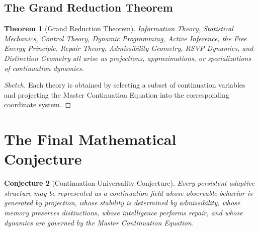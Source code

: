 \documentclass[12pt,a4paper]{article}
\newtheorem{theorem}{Theorem}[section]
\newtheorem{conjecture}[theorem]{Conjecture}
\begin{document}
\subsection{The Grand Reduction Theorem}

\begin{theorem}[Grand Reduction Theorem]
Information Theory, Statistical Mechanics, Control Theory, Dynamic Programming, Active Inference, the Free Energy Principle, Repair Theory, Admissibility Geometry, RSVP Dynamics, and Distinction Geometry all arise as projections, approximations, or specializations of continuation dynamics.
\end{theorem}

\begin{proof}[Sketch]
Each theory is obtained by selecting a subset of continuation variables and projecting the Master Continuation Equation into the corresponding coordinate system.
\end{proof}

\section{The Final Mathematical Conjecture}

\begin{conjecture}[Continuation Universality Conjecture]
Every persistent adaptive structure may be represented as a continuation field whose observable behavior is generated by projection, whose stability is determined by admissibility, whose memory preserves distinctions, whose intelligence performs repair, and whose dynamics are governed by the Master Continuation Equation.
\end{conjecture}

\newpage
\end{document}
